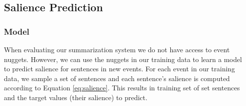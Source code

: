 
%

\subsection{Salience Prediction}
\label{sec:salpred}

\subsubsection{Model}

When evaluating our summarization system
we do not have access to event nuggets. However, we can use the nuggets
in our training data to learn a model to predict salience for sentences
in new events.
For each event in our training data, we sample a set of sentences and  each 
sentence's salience is computed according to Equation \ref{eq:salience}.
This results in training set of set sentences and the target values 
(their salience) to predict.

